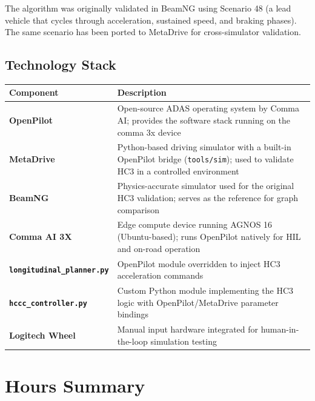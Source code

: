 \documentclass[12pt]{article}
\begin{document}
The algorithm was originally validated in BeamNG using Scenario 48 (a lead vehicle that cycles through acceleration, sustained speed, and braking phases). The same scenario has been ported to MetaDrive for cross-simulator validation.

\subsection{Technology Stack}

\begin{center}
\begin{tabular}{>{\bfseries}p{3.5cm} p{9cm}}
  \toprule
  Component & Description \\
  \midrule
  OpenPilot & Open-source ADAS operating system by Comma AI; provides the software stack running on the comma 3x device \\
  MetaDrive & Python-based driving simulator with a built-in OpenPilot bridge (\texttt{tools/sim}); used to validate HC3 in a controlled environment \\
  BeamNG & Physics-accurate simulator used for the original HC3 validation; serves as the reference for graph comparison \\
  Comma AI 3X & Edge compute device running AGNOS 16 (Ubuntu-based); runs OpenPilot natively for HIL and on-road operation \\
  \texttt{longitudinal\_planner.py} & OpenPilot module overridden to inject HC3 acceleration commands \\
  \texttt{hccc\_controller.py} & Custom Python module implementing the HC3 logic with OpenPilot/MetaDrive parameter bindings \\
  Logitech Wheel & Manual input hardware integrated for human-in-the-loop simulation testing \\
  \bottomrule
\end{tabular}
\end{center}

\section{Hours Summary}
\end{document}
